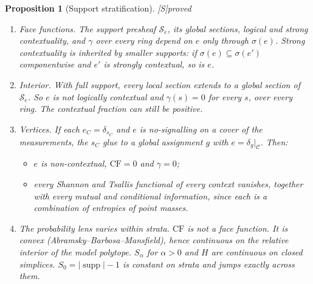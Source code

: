 \documentclass[11pt]{article}
\newtheorem{proposition}[theorem]{Proposition}
\theoremstyle{definition}
\theoremstyle{remark}
\newcommand{\CF}{\mathrm{CF}}
\newcommand{\src}[1]{\textsf{\small[#1]}}
\newcommand{\st}[1]{\textsf{\small\color{gray}#1}}
\begin{document}
\begin{proposition}[Support stratification]\label{prop:strata}\src{S}\st{proved}
\begin{enumerate}
  \item \emph{Face functions.} The support presheaf $\mathcal S_e$, its global sections, logical and strong contextuality, and $\gamma$ over every ring depend on $e$ only through $\sigma(e)$. Strong contextuality is inherited by smaller supports: if $\sigma(e)\subseteq\sigma(e')$ componentwise and $e'$ is strongly contextual, so is $e$.
  \item \emph{Interior.} With full support, every local section extends to a global section of $\mathcal S_e$. So $e$ is not logically contextual and $\gamma(s)=0$ for every $s$, over every ring. The contextual fraction can still be positive.
  \item \emph{Vertices.} If each $e_C=\delta_{s_C}$ and $e$ is no-signalling on a cover of the measurements, the $s_C$ glue to a global assignment $g$ with $e=\delta_g|_{\mathcal C}$. Then:
  \begin{itemize}
    \item $e$ is non-contextual, $\CF=0$ and $\gamma=0$;
    \item every Shannon and Tsallis functional of every context vanishes, together with every mutual and conditional information, since each is a combination of entropies of point masses.
  \end{itemize}
  \item \emph{The probability lens varies within strata.} $\CF$ is not a face function. It is convex (Abramsky--Barbosa--Mansfield), hence continuous on the relative interior of the model polytope. $S_\alpha$ for $\alpha>0$ and $H$ are continuous on closed simplices. $S_0=|\operatorname{supp}|-1$ is constant on strata and jumps exactly across them.
\end{enumerate}
\end{proposition}
\end{document}
